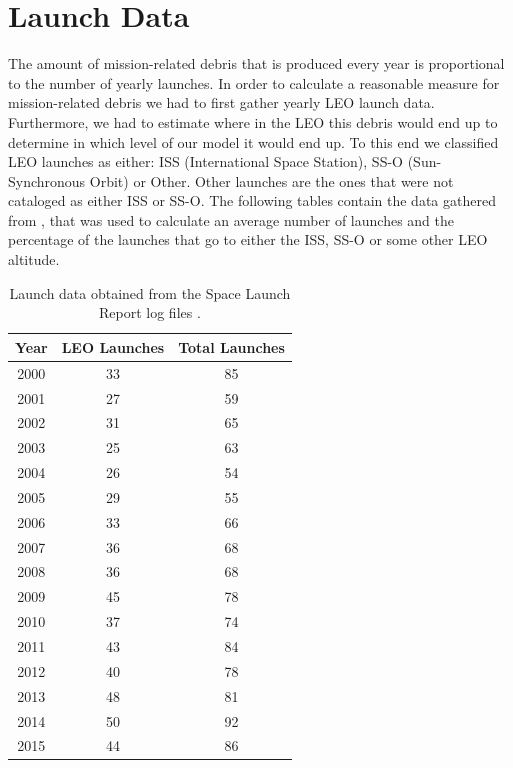 \documentclass[pre,12pt]{revtex4-1}
\begin{document}
\clearpage
\section{Launch Data}\label{AppendixB}

The amount of mission-related debris that is produced every year is proportional to the number of yearly launches. In order to calculate a reasonable measure for mission-related debris we had to first gather yearly LEO launch data. Furthermore, we had to estimate where in the LEO this debris would end up to determine in which level of our model it would end up. To this end we classified LEO launches as either: ISS (International Space Station), SS-O (Sun-Synchronous Orbit) or Other. Other launches are the ones that were not cataloged as either ISS or SS-O. The following tables contain the data gathered from \cite{spaceLaunchReport}, that was used to calculate an average number of launches and the percentage of the launches that go to either the ISS, SS-O or some other LEO altitude.
\
\begin{table}[htb]
    \begin{tabular}{| c | c | c |} \hline
    \textbf{Year} & \textbf{LEO Launches} & \textbf{Total Launches} \\ \hline
    2000 & 33 & 85 \\ \hline
    2001 & 27 & 59 \\ \hline
    2002 & 31 & 65 \\ \hline
    2003 & 25 & 63 \\ \hline
    2004 & 26 & 54 \\ \hline
    2005 & 29 & 55 \\ \hline
    2006 & 33 & 66 \\ \hline
    2007 & 36 & 68 \\ \hline
    2008 & 36 & 68 \\ \hline 
    2009 & 45 & 78 \\ \hline
    2010 & 37 & 74 \\ \hline
    2011 & 43 & 84 \\ \hline
    2012 & 40 & 78 \\ \hline
    2013 & 48 & 81 \\ \hline
    2014 & 50 & 92 \\ \hline
    2015 & 44 & 86 \\ \hline
    \end{tabular}
\caption{Launch data obtained from the Space Launch Report log files \cite{spaceLaunchReport}.}
\end{table}
\end{document}
